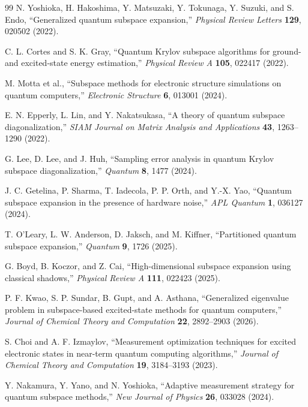 \documentclass[
  reprint,
  amsmath,
  amssymb,
  aps,
  pra,
  nofootinbib,
  superscriptaddress,
  floatfix
]{revtex4-2}
\begin{document}
\begin{thebibliography}{99}
N. Yoshioka, H. Hakoshima, Y. Matsuzaki, Y. Tokunaga, Y. Suzuki, and S. Endo,
``Generalized quantum subspace expansion,''
\emph{Physical Review Letters} \textbf{129}, 020502 (2022).

C. L. Cortes and S. K. Gray,
``Quantum Krylov subspace algorithms for ground- and excited-state energy estimation,''
\emph{Physical Review A} \textbf{105}, 022417 (2022).

M. Motta et al.,
``Subspace methods for electronic structure simulations on quantum computers,''
\emph{Electronic Structure} \textbf{6}, 013001 (2024).

E. N. Epperly, L. Lin, and Y. Nakatsukasa,
``A theory of quantum subspace diagonalization,''
\emph{SIAM Journal on Matrix Analysis and Applications} \textbf{43}, 1263--1290 (2022).

G. Lee, D. Lee, and J. Huh,
``Sampling error analysis in quantum Krylov subspace diagonalization,''
\emph{Quantum} \textbf{8}, 1477 (2024).

J. C. Getelina, P. Sharma, T. Iadecola, P. P. Orth, and Y.-X. Yao,
``Quantum subspace expansion in the presence of hardware noise,''
\emph{APL Quantum} \textbf{1}, 036127 (2024).

T. O'Leary, L. W. Anderson, D. Jaksch, and M. Kiffner,
``Partitioned quantum subspace expansion,''
\emph{Quantum} \textbf{9}, 1726 (2025).

G. Boyd, B. Koczor, and Z. Cai,
``High-dimensional subspace expansion using classical shadows,''
\emph{Physical Review A} \textbf{111}, 022423 (2025).

P. F. Kwao, S. P. Sundar, B. Gupt, and A. Asthana,
``Generalized eigenvalue problem in subspace-based excited-state methods for quantum computers,''
\emph{Journal of Chemical Theory and Computation} \textbf{22}, 2892--2903 (2026).

S. Choi and A. F. Izmaylov,
``Measurement optimization techniques for excited electronic states in near-term quantum computing algorithms,''
\emph{Journal of Chemical Theory and Computation} \textbf{19}, 3184--3193 (2023).

Y. Nakamura, Y. Yano, and N. Yoshioka,
``Adaptive measurement strategy for quantum subspace methods,''
\emph{New Journal of Physics} \textbf{26}, 033028 (2024).


\end{thebibliography}
\end{document}
